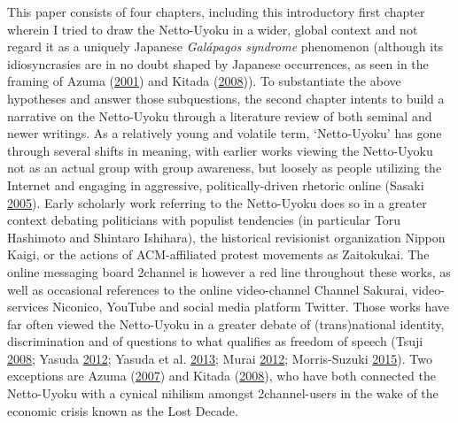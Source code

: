 \documentclass[10pt,british,A4paper,,openany]{memoir}
\begin{document}
This paper consists of four chapters, including this introductory first
chapter wherein I tried to draw the Netto-Uyoku in a wider, global
context and not regard it as a uniquely Japanese \emph{Galápagos
syndrome} phenomenon (although its idiosyncrasies are in no doubt shaped
by Japanese occurrences, as seen in the framing of Azuma
(\protect\hyperlink{ref-azuma_otaku:_2001}{2001}) and Kitada
(\protect\hyperlink{ref-kitada__2008}{2008})). To substantiate the above
hypotheses and answer those subquestions, the second chapter intents to
build a narrative on the Netto-Uyoku through a literature review of both
seminal and newer writings. As a relatively young and volatile term,
`Netto-Uyoku' has gone through several shifts in meaning, with earlier
works viewing the Netto-Uyoku not as an actual group with group
awareness, but loosely as people utilizing the Internet and engaging in
aggressive, politically-driven rhetoric online (Sasaki
\protect\hyperlink{ref-sasaki_netto-uyoku_2005}{2005}). Early scholarly
work referring to the Netto-Uyoku does so in a greater context debating
politicians with populist tendencies (in particular Toru Hashimoto and
Shintaro Ishihara), the historical revisionist organization Nippon
Kaigi, or the actions of ACM-affiliated protest movements as Zaitokukai.
The online messaging board 2channel is however a red line throughout
these works, as well as occasional references to the online
video-channel Channel Sakurai, video-services Niconico, YouTube and
social media platform Twitter. Those works have far often viewed the
Netto-Uyoku in a greater debate of (trans)national identity,
discrimination and of questions to what qualifies as freedom of speech
(Tsuji \protect\hyperlink{ref-tsuji_eng:_2008}{2008}; Yasuda
\protect\hyperlink{ref-yasuda_eng:_2012}{2012}; Yasuda et al.
\protect\hyperlink{ref-yasuda_:_2013}{2013}; Murai
\protect\hyperlink{ref-murai_net_2012}{2012}; Morris-Suzuki
\protect\hyperlink{ref-morris-suzuki_beyond_2015}{2015}). Two exceptions
are Azuma (\protect\hyperlink{ref-azuma__2007}{2007}) and Kitada
(\protect\hyperlink{ref-kitada__2008}{2008}), who have both connected
the Netto-Uyoku with a cynical nihilism amongst 2channel-users in the
wake of the economic crisis known as the Lost Decade.
\end{document}
